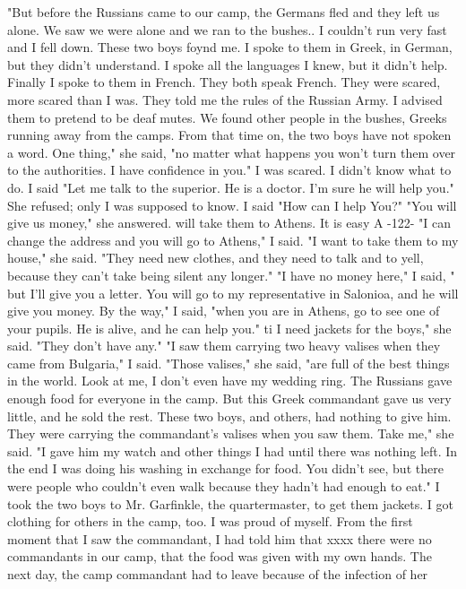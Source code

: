 "But before the Russians 
came to our camp, the Germans fled and they left us alone.
We saw we were alone and 
we ran to the bushes.. I couldn't run very fast and I fell down.
These two boys 
foynd me.
I spoke to them in Greek, in German, but they didn't understand.
I spoke 
all the languages I knew, but it didn't help.
Finally I spoke to them in French.
They both speak French.
They were scared, more scared than I was.
They told me the 
rules of the Russian Army.
I advised them to pretend to be deaf mutes.
We found 
other people in the bushes, Greeks running away from the camps.
From that time on, 
the two boys have not spoken a word.
One thing," she said, "no matter what happens 
you won't turn them over to the authorities.
I have confidence in you."
I was scared.
I didn't know what to do.
I said "Let me talk to the superior.
He is a doctor.
I'm sure he will help you."
She refused; only I was supposed to 
know.
I said "How can I help You?"
"You will give us money," she answered.
will take them to Athens.
It is easy 
A 
-122- 
"I can change the address and you will go to Athens," I said.
"I want to take them to my house," she said.
"They need new clothes, and they 
need to talk and to yell, because they can't take being silent any longer."
"I have no money here," I said, " but I'll give you a letter.
You will go to 
my representative in Salonioa, and he will give you money.
By the way," I said, 
"when you are in Athens, go to see one of your pupils.
He is alive, and he can help 
you."
ti 
I need jackets for the boys," she said.
"They don't have any."
"I saw them carrying two heavy valises when they came from Bulgaria," I said.
"Those valises," she said, "are full of the best things in the world.
Look at 
me, I don't even have my wedding ring.
The Russians gave enough food for everyone 
in the camp.
But this Greek commandant gave us very little, and he sold the rest.
These two boys, and others, had nothing to give him.
They were carrying the 
commandant's valises when you saw them.
Take me," she said.
"I gave him my watch 
and other things I had until there was nothing left.
In the end I was doing his 
washing in exchange for food.
You didn't see, but there were people who couldn't even 
walk because they hadn't had enough to eat."
I took the two boys to Mr.
Garfinkle, the quartermaster, to get them jackets.
I 
got clothing for others in the camp, too.
I was proud of myself.
From the first 
moment that I saw the commandant, I had told him that xxxx there were no commandants 
in our camp, that the food was given with my own hands.
The next day, the camp commandant had to leave because of the infection of her 
